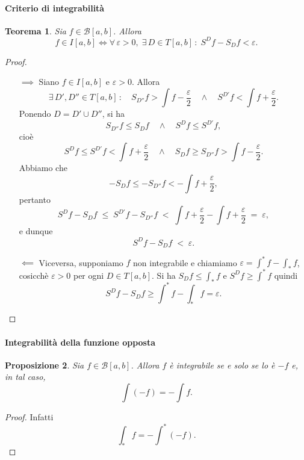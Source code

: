 \documentclass{article}
\theoremstyle{plain}
\newtheorem{thm}{Teorema}[section]
\newtheorem{prop}[thm]{Proposizione}
\theoremstyle{definition}
\theoremstyle{remark}
\begin{document}
\vspace{10pt}

\paragraph{Criterio di integrabilità}
\begin{bxthm}
\begin{thm}
    Sia $f\in \mathcal{B}[a,b]$. Allora 
    \[f\in I[a,b]\iff\forall\,\varepsilon>0,\;\exists\,D\in T[a,b]\,:\;S^Df-S_Df<\varepsilon.\]
\end{thm}
\end{bxthm}
\begin{proof}\hfill
    \begin{itemize}
        \item[$\implies$]
        Siano $f\in I[a,b]$ e $\varepsilon>0$. Allora  
        \[
            \exists\,D',D''\in T[a,b]\,:\quad
        S_{D''}f>\int f-\dfrac{\varepsilon}{2}\quad\land\quad S^{D'}f<\int f+\dfrac{\varepsilon}{2}.
        \]
        Ponendo $D=D'\cup D''$, si ha 
        \[ S_{D''}f \leq S_Df \quad\land\quad S^Df\leq S^{D'}f,\]
        cioè 
        \[ S^Df\leq S^{D'}f <\int f+\dfrac{\varepsilon}{2}\quad\land\quad S_Df\geq S_{D''}f>\int f-\dfrac{\varepsilon}{2}. \]
        Abbiamo che 
        \[-S_Df\leq -S_{D''}f <-\int f+\dfrac{\varepsilon}{2},\]
        pertanto 
        \[S^Df-S_Df\;\leq\; S^{D'}f-S_{D''}f\;<\;\int f+\dfrac{\varepsilon}{2}-\int f+\dfrac{\varepsilon}{2}\;=\;\varepsilon,\]
        e dunque
        \[S^Df-S_Df\;<\;\varepsilon.\]
        \item[$\impliedby$]
        Viceversa, supponiamo $f$ non integrabile e chiamiamo 
        $\varepsilon=\int^*f-\int_*f$, cosicchè $\varepsilon>0$ per ogni $D\in T[a,b]$. Si ha 
        $S_Df\leq\int_*f$ e $S^Df\geq\int^*f$ quindi 
        \[S^Df-S_Df\geq\int^*f-\int_*f=\varepsilon.\]
    \end{itemize}
\end{proof}

\vspace{10pt}

\paragraph{Integrabilità della funzione opposta}
\begin{bxthm}
\begin{prop}
    Sia $f\in\mathcal{B}[a,b]$. Allora $f$ è integrabile se e solo se lo è $-f$ e, in tal caso, 
    \[\int(-f)=-\int f.\]
\end{prop}
\end{bxthm}
\begin{proof}
    Infatti \[\int_*f=-\int^*(-f).\]
\end{proof}
\end{document}
